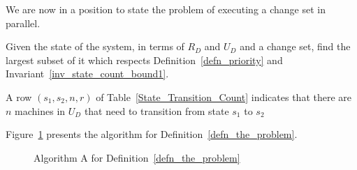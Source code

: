 We are now in a position to state the problem of executing a change set
in parallel.
\begin{definition}
\label{defn_the_problem}
Given the state of the system, in terms of \(R_D\) and \(U_D\) and 
a change set, find the largest subset of it which respects
Definition~\ref{defn_priority} and
Invariant~\ref{inv_state_count_bound1}.
\end{definition}


\begin{definition}
A row \((s_1, s_2, n, r)\) of Table~\ref{State_Transition_Count}
indicates that there are \(n\) machines in \(U_D\) that need to
transition from state \(s_1\) to \(s_2\)
\end{definition}

Figure~\ref{algo} presents the algorithm for Definition~\ref{defn_the_problem}.

\begin{figure}
\centering
{}
\label{algo}
\caption{Algorithm A for Definition~\ref{defn_the_problem}}
\end{figure}

